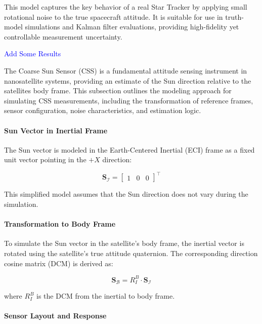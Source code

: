 This model captures the key behavior of a real Star Tracker by applying small rotational noise to the true spacecraft attitude. 
It is suitable for use in truth-model simulations and Kalman filter evaluations, providing high-fidelity yet controllable measurement uncertainty.


\textcolor{blue}{Add Some Results}


\label{sec:css}

The Coarse Sun Sensor (CSS) is a fundamental attitude sensing instrument in nanosatellite systems, providing an estimate of the Sun direction relative to the satellites body frame. This subsection outlines the modeling approach for simulating CSS measurements, including the transformation of reference frames, sensor configuration, noise characteristics, and estimation logic.

\paragraph{Sun Vector in Inertial Frame}

The Sun vector is modeled in the Earth-Centered Inertial (ECI) frame as a fixed unit vector pointing in the $+X$ direction:

\begin{equation}
    \mathbf{S}_\mathcal{I} = \begin{bmatrix} 1 & 0 & 0 \end{bmatrix}^\top
\end{equation}

This simplified model assumes that the Sun direction does not vary during the simulation.

\paragraph{Transformation to Body Frame}

To simulate the Sun vector in the satellite’s body frame, the inertial vector is rotated using the satellite's true attitude quaternion. The corresponding direction cosine matrix (DCM) is derived as:

\begin{equation}
     \mathbf{S}_\mathcal{B} = R_I^B \cdot \mathbf{S}_\mathcal{I}
\end{equation}

where $R_I^B$ is the DCM from the inertial to body frame.

\paragraph{Sensor Layout and Response}


